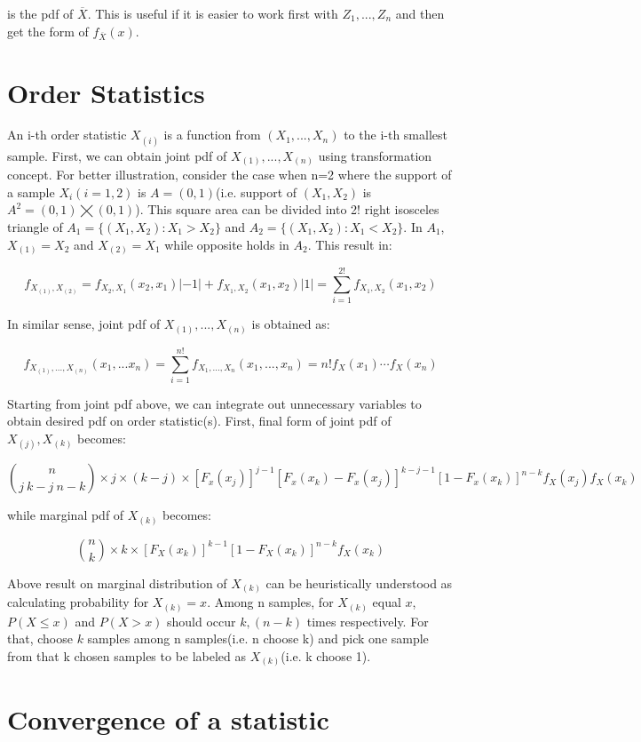 \documentclass[10pt]{article}
\begin{document}
\noindent is the pdf of $\overline{X}$. This is useful if it is easier to work first with $Z_1,...,Z_n$ and then get the form of $f_{\overline{X}}(x)$.

\section{Order Statistics}
An i-th order statistic $X_{(i)}$ is a function from $(X_1,...,X_n)$ to the i-th smallest sample. First, we can obtain joint pdf of $X_{(1)},...,X_{(n)}$ using transformation concept. For better illustration, consider the case when n=2 where the support of a sample $X_i(i=1,2)$ is $A=(0,1)$(i.e. support of $(X_1, X_2)$ is $A^2=(0,1)\bigtimes (0,1)$). This square area can be divided into 2! right isosceles triangle of $A_1=\{(X_1, X_2):X_1>X_2\}$ and $A_2=\{(X_1, X_2):X_1<X_2\}$. In $A_1$, $X_{(1)}=X_2$ and $X_{(2)}=X_1$ while opposite holds in $A_2$. This result in:

$$
f_{X_{(1)}, X_{(2)}}=f_{X_2, X_1}(x_2,x_1)|-1|+f_{X_1, X_2}(x_1,x_2)|1|=\displaystyle \sum_{i=1}^{2!}f_{X_1, X_2}(x_1,x_2)
$$

\noindent In similar sense, joint pdf of $X_{(1)},...,X_{(n)}$ is obtained as:

$$
f_{X_{(1)},...,X_{(n)}}(x_1,...x_n)=\displaystyle \sum_{i=1}^{n!}f_{X_1,...,X_n}(x_1,...,x_n)=n!f_X(x_1)\cdots f_X(x_n)
$$

\noindent Starting from joint pdf above, we can integrate out unnecessary variables to obtain desired pdf on order statistic(s). First, final form of joint pdf of $X_{(j)}, X_{(k)}$ becomes:

$$
{n\choose j\ k-j\ n-k}\times j\times (k-j)\times [F_x(x_j)]^{j-1}[F_x(x_k)-F_x(x_j)]^{k-j-1}[1-F_x(x_k)]^{n-k}f_X(x_j)f_X(x_k)
$$

\noindent while marginal pdf of $X_{(k)}$ becomes:

$$
{n \choose k}\times k\times[F_X(x_k)]^{k-1}[1-F_X(x_k)]^{n-k}f_X(x_k)
$$

\noindent Above result on marginal distribution of $X_{(k)}$ can be heuristically understood as calculating probability for $X_{(k)}=x$. Among n samples, for $X_{(k)}$ equal $x$, $P(X \leq x)$ and $P(X > x)$ should occur $k, (n-k)$ times respectively. For that, choose $k$ samples among n samples(i.e. n choose k) and pick one sample from that k chosen samples to be labeled as $X_{(k)}$(i.e. k choose 1).

\section{Convergence of a statistic}
\end{document}
